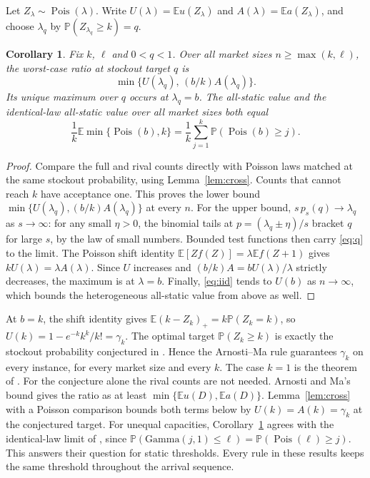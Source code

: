 \documentclass[11pt,a4paper]{article}
\newtheorem{cor}[thm]{Corollary}
\theoremstyle{remark}
\newcommand{\E}{\mathbb E}
\newcommand{\Prob}{\mathbb P}
\newcommand{\Pois}{\operatorname{Pois}}
\begin{document}
Let $Z_\lambda\sim\Pois(\lambda)$. Write $U(\lambda)=\E u(Z_\lambda)$ and $A(\lambda)=\E a(Z_\lambda)$, and choose $\lambda_q$ by $\Prob(Z_{\lambda_q}\ge k)=q$.
\begin{cor}\label{cor:limit}
Fix $k$, $\ell$ and $0<q<1$. Over all market sizes $n\ge\max(k,\ell)$, the worst-case ratio at stockout target $q$ is
\[
 \min\{U(\lambda_q),\,(b/k)A(\lambda_q)\}.
\]
Its unique maximum over $q$ occurs at $\lambda_q=b$. The all-static value and the identical-law all-static value over all market sizes both equal
\[
 \frac1k\E\min\{\Pois(b),k\}=\frac1k\sum_{j=1}^k\Prob(\Pois(b)\ge j).
\]
\end{cor}
\begin{proof}
Compare the full and rival counts directly with Poisson laws matched at the same stockout probability, using Lemma~\ref{lem:cross}. Counts that cannot reach $k$ have acceptance one. This proves the lower bound $\min\{U(\lambda_q),(b/k)A(\lambda_q)\}$ at every $n$. For the upper bound, $s\,p_s(q)\to\lambda_q$ as $s\to\infty$: for any small $\eta>0$, the binomial tails at $p=(\lambda_q\pm\eta)/s$ bracket $q$ for large $s$, by the law of small numbers. Bounded test functions then carry \eqref{eq:q} to the limit. The Poisson shift identity $\E[Zf(Z)]=\lambda\E f(Z+1)$ gives $kU(\lambda)=\lambda A(\lambda)$. Since $U$ increases and $(b/k)A=bU(\lambda)/\lambda$ strictly decreases, the maximum is at $\lambda=b$. Finally, \eqref{eq:iid} tends to $U(b)$ as $n\to\infty$, which bounds the heterogeneous all-static value from above as well.
\end{proof}
At $b=k$, the shift identity gives $\E(k-Z_k)_+=k\Prob(Z_k=k)$, so $U(k)=1-e^{-k}k^k/k!=\gamma_k$. The optimal target $\Prob(Z_k\ge k)$ is exactly the stockout probability conjectured in \cite[\S5.2]{am}. Hence the Arnosti--Ma rule guarantees $\gamma_k$ on every instance, for every market size and every $k$. The case $k=1$ is the theorem of \cite{ehks}. For the conjecture alone the rival counts are not needed. Arnosti and Ma's bound \cite[Lemma~1]{am} gives the ratio as at least $\min\{\E u(D),\E a(D)\}$. Lemma~\ref{lem:cross} with a Poisson comparison bounds both terms below by $U(k)=A(k)=\gamma_k$ at the conjectured target. For unequal capacities, Corollary~\ref{cor:limit} agrees with the identical-law limit of \cite[Theorem~1.4]{mg}, since $\Prob(\mathrm{Gamma}(j,1)\le\ell)=\Prob(\Pois(\ell)\ge j)$. This answers their question for static thresholds. Every rule in these results keeps the same threshold throughout the arrival sequence.
\end{document}

